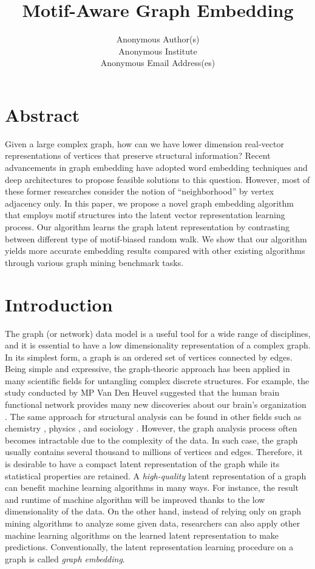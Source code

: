 \documentclass[letterpaper]{article}
\title{Motif-Aware Graph Embedding}
\author{
    Anonymous Author(s) \\
    Anonymous Institute \\
    Anonymous Email Address(es) \\
}
\begin{document}
    \maketitle

    \section{Abstract}
       Given a large complex graph, how can we have lower dimension real-vector representations 
       of vertices that preserve structural information? Recent advancements in graph embedding 
       have adopted word embedding techniques and deep architectures to propose feasible solutions
       to this question. However, most of these former researches consider the notion of ``neighborhood'' 
       by vertex adjacency only. In this paper, we propose a novel graph embedding algorithm that employs 
       motif structures into the latent vector representation learning process. Our algorithm learns 
       the graph latent representation by contrasting between different type of motif-biased random walk. 
       We show that our algorithm yields more accurate embedding results compared with other existing 
       algorithms through various graph mining benchmark tasks.

    \setcounter{secnumdepth}{2}
    \section{Introduction}
        The graph (or network) data model is a useful tool for a wide range of disciplines, and
        it is essential to have a low dimensionality representation of a complex graph. In its
        simplest form, a graph is an ordered set of vertices connected by edges. Being simple
        and expressive, the graph-theoric approach has been applied in many scientific fields
        for untangling complex discrete structures. For example, the study conducted by 
        MP Van Den Heuvel suggested that the human brain functional network provides many new
        discoveries about our brain's organization \cite{brainnetheuvel}. The same approach
        for structural analysis can be found in other fields such as chemistry \cite{molecule}, 
        physics \cite{physicnet}, and sociology \cite{sociology}. However, the graph analysis
        process often becomes intractable due to the complexity of the data. In such case,
        the graph usually contains several thousand to millions of vertices and edges.
        Therefore, it is desirable to have a compact latent representation of the graph while
        its statistical properties are retained. A \emph{high-quality} latent representation
        of a graph can benefit machine learning algorithms in many ways. For instance, 
        the result and runtime of machine algorithm will be improved thanks to the low
        dimensionality of the data. On the other hand, instead of relying only on graph 
        mining algorithms to analyze some given data, researchers can also apply other
        machine learning algorithms on the learned latent representation to make predictions.
        Conventionally, the latent representation learning procedure on a graph is called
        \emph{graph embedding}.
\end{document}
